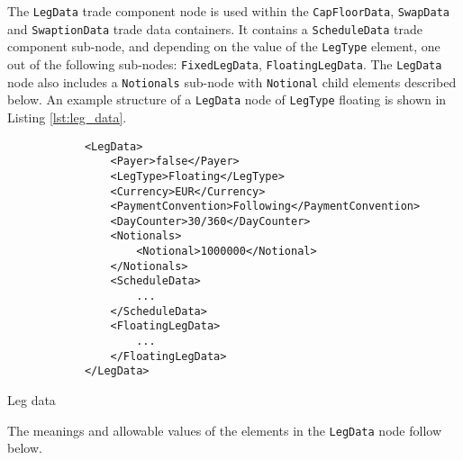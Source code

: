 The \lstinline!LegData! trade component node is used within the
\lstinline!CapFloorData!,  \lstinline!SwapData! and
\lstinline!SwaptionData! trade data containers. It contains a
\lstinline!ScheduleData! trade component sub-node, and depending on
the value of the \lstinline!LegType! element, one out of the following
sub-nodes:  \lstinline!FixedLegData!, \lstinline!FloatingLegData!. The
\lstinline!LegData! node also includes a \lstinline!Notionals!
sub-node  with \lstinline!Notional! child elements described below. An
example structure of a \lstinline!LegData! node of \lstinline!LegType!
floating is shown in Listing \ref{lst:leg_data}.

\begin{listing}[H]
\begin{verbatim}
            <LegData>
                <Payer>false</Payer>
                <LegType>Floating</LegType>
                <Currency>EUR</Currency>
                <PaymentConvention>Following</PaymentConvention>
                <DayCounter>30/360</DayCounter>
                <Notionals>
                    <Notional>1000000</Notional>
                </Notionals>
                <ScheduleData>
                    ...
                </ScheduleData>
                <FloatingLegData>
                    ...
                </FloatingLegData>
            </LegData>
\end{verbatim}
\caption{Leg data}
\label{lst:leg_data}
\end{listing}

The meanings and allowable values of the elements in the \lstinline!LegData! node follow below.

